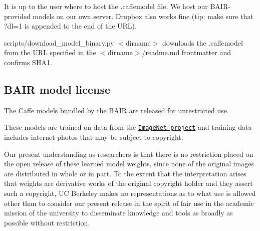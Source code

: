 It is up to the user where to host the {\ttfamily .caffemodel} file. We host our B\+A\+I\+R-\/provided models on our own server. Dropbox also works fine (tip\+: make sure that {\ttfamily ?dl=1} is appended to the end of the U\+RL).

{\ttfamily scripts/download\+\_\+model\+\_\+binary.\+py $<$dirname$>$} downloads the {\ttfamily .caffemodel} from the U\+RL specified in the {\ttfamily $<$dirname$>$/readme.md} frontmatter and confirms S\+H\+A1.

\subsection*{B\+A\+IR model license}

The Caffe models bundled by the B\+A\+IR are released for unrestricted use.

These models are trained on data from the \href{http://www.image-net.org/}{\tt Image\+Net project} and training data includes internet photos that may be subject to copyright.

Our present understanding as researchers is that there is no restriction placed on the open release of these learned model weights, since none of the original images are distributed in whole or in part. To the extent that the interpretation arises that weights are derivative works of the original copyright holder and they assert such a copyright, UC Berkeley makes no representations as to what use is allowed other than to consider our present release in the spirit of fair use in the academic mission of the university to disseminate knowledge and tools as broadly as possible without restriction. 